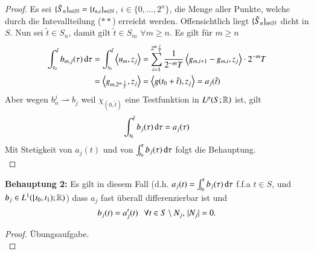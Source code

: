 \begin{proof}
    Es sei $\{\tilde S_n\}_{n\in\mathbb{N}}= \{t_{n,i}\}_{n\in\mathbb{N}}$, $i\in \{0, …, 2^n\}$, die Menge aller Punkte,
    welche durch die Intevallteilung ($**$) erreicht werden. Offensichtlich liegt $\{\tilde S_n\}
    _{n\in \mathbb{N}}$ dicht in $S$. Nun sei $\tilde t\in S_n$, damit gilt $\tilde t\in S_m$ $\forall m\geq n.$
    Es gilt für $m\geq n$
    \begin{align*}
        \int_{t_0}^{\tilde t} b_{m,j}(\tau) \, \mathrm{d} \tau &= \int_{t_0}^{\tilde t} \left\langle u_m,z_j\right\rangle 
        = \sum_{i=1}^{2^m\frac{\tilde t}T} \frac1{2^{-m}T}\left\langle g_{m,i+1} - g_{m,i}, z_j\right\rangle \cdot 2^{-m}T
        \\
        &= \left\langle g_{m, 2^m\frac{\tilde t}T}, z_j\right\rangle = \left\langle g(t_0+ \tilde t), z_j \right\rangle = a_j (\tilde t)
    \end{align*}
    Aber wegen $b_n^j\rightharpoonup b_j$ weil $\chi_{(0,\tilde t)}$ eine Testfunktion in $L^p(S;\mathbb{R})$
    ist, gilt
    \[
        \int_{t_0}^{\tilde t} b_j(\tau) \, \mathrm{d} \tau= a_j(\tau)
    \]
    Mit Stetigkeit von $a_j(t)$ und von $\int_{t_0}^t b_j(\tau)\, \mathrm{d}\tau$ folgt die Behauptung.\[ \] 
\end{proof}
\noindent\textbf{Behauptung 2:} Es gilt in diesem Fall (d.h. $a_j(t)=\int_{t_0}^tb_j(\tau)\, \mathrm{d}\tau$ f.f.a
$t\in S$, und $b_j\in L^1([t_0,t_1);\mathbb{R})$) dass $a_j$ fast überall differenzierbar ist und
\[
    b_j(t)=a'_j(t) \hspace{.25cm} \forall t\in S\setminus N_j, \, |N_j|=0.
\]
\begin{proof}
    Übungsaufgabe. \[ \]
\end{proof}

